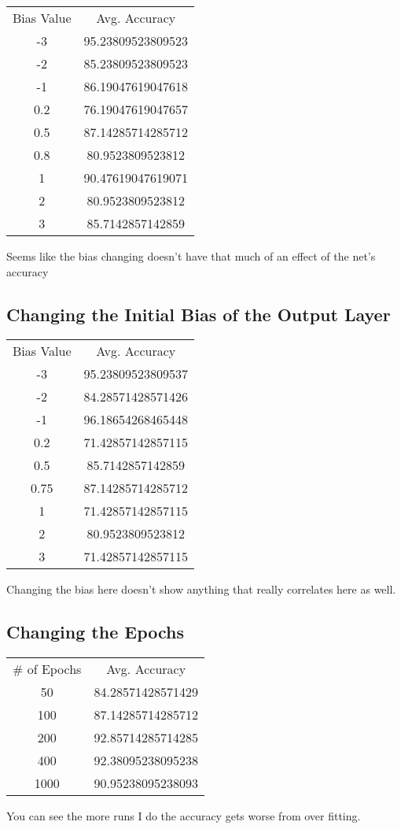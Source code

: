 \documentclass[letterpaper]{article}
\begin{document}
\begin{center}
\begin{tabular}{ c c  }
Bias Value & Avg. Accuracy\\
-3 & 95.23809523809523\\
-2 & 85.23809523809523\\
-1 & 86.19047619047618\\
0.2 & 76.19047619047657\\
0.5 & 87.14285714285712\\
0.8 & 80.9523809523812\\
1 & 90.47619047619071\\
2  & 80.9523809523812\\
3 & 85.7142857142859\\
\end{tabular}
\end{center}


Seems like the bias changing doesn't have that much of an effect of the net's accuracy  

\subsection{Changing the Initial Bias of the Output Layer}
\begin{center}
\begin{tabular}{ c c  }
Bias Value & Avg. Accuracy\\
-3 & 95.23809523809537\\
-2 & 84.28571428571426\\
-1 & 96.18654268465448\\
0.2 & 71.42857142857115\\
0.5 & 85.7142857142859\\
0.75 & 87.14285714285712\\
1 & 71.42857142857115\\
2 & 80.9523809523812\\
3 & 71.42857142857115\\
\end{tabular}
\end{center}
Changing the bias here doesn't show anything that really correlates here as well. 

\subsection{Changing the Epochs}

\begin{center}
\begin{tabular}{ c c }
\# of Epochs & Avg. Accuracy\\ 
50 & 84.28571428571429\\
100 & 87.14285714285712\\
200 & 92.85714285714285\\
400 & 92.38095238095238\\
1000 & 90.95238095238093\\
\end{tabular}
\end{center}
You can see the more runs I do the accuracy gets worse from over fitting.

\begin{lstlisting}
\end{lstlisting}
\end{document}
